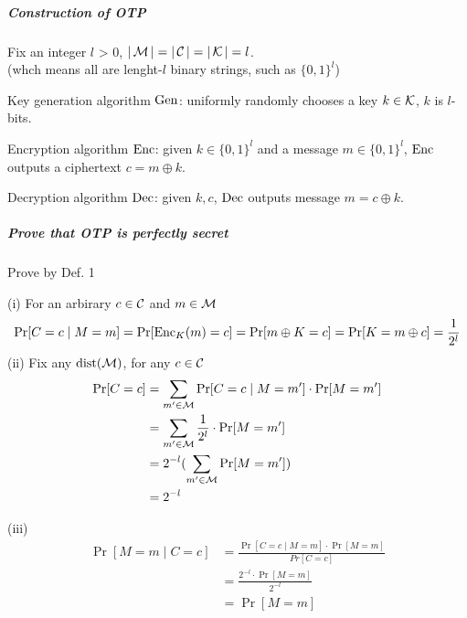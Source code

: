 \subparagraph{Construction of OTP}

Fix an integer \(l\) > 0, \(|\operatorname{\mathcal{M}}| = |\operatorname{\mathcal{C}}| = |\operatorname{\mathcal{K}}| = l\). \\
(whch means all are lenght-\(l\) binary strings, such as \(\{0, 1\}^l\))

Key generation algorithm \(\operatorname{Gen}\): uniformly randomly chooses a key \(k \in \operatorname{\mathcal{K}}\), \(k\) is \(l\)-bits.

Encryption algorithm \(\operatorname{Enc}\): given \(k \in \{0, 1\}^l\) and a message \(m \in \{0, 1\}^l\), \(\operatorname{Enc}\) outputs a ciphertext \(c = m \oplus k\).

Decryption algorithm \(\operatorname{Dec}\): given \(k, c\), \(\operatorname{Dec}\) outputs message \(m = c \oplus k\).

\subparagraph{Prove that OTP is perfectly secret}

Prove by Def. 1

(i) For an arbirary \(c \in \operatorname{\mathcal{C}}\) and \(m \in \operatorname{\mathcal{M}}\) \\
\[ \Pr[C = c \mid M = m] = \Pr[\operatorname{Enc}_K(m) = c] = \Pr[m \oplus K = c] = \Pr[K = m \oplus c] = \frac{1}{2^l}\]
(ii) Fix any \(\operatorname{dist}(\operatorname{\mathcal{M}})\), for any \(c \in \operatorname{\mathcal{C}}\)
\begin{align*}
	\Pr [C = c] &= \sum_{m' \in \operatorname{\mathcal{M}}} \Pr[C = c \mid M = m'] \cdot \Pr[M = m'] \\
	&= \sum_{m' \in \operatorname{\mathcal{M}}} \frac{1}{2^l} \cdot \Pr[M = m'] \\
	&= 2^{-l} (\sum_{m' \in \operatorname{\mathcal{M}}} \Pr[M = m']) \\
	&= 2^{-l}
\end{align*}

(iii)
\begin{align*}
	\Pr[M = m \mid C = c] &= \frac{\Pr[C = c \mid M = m] \cdot \Pr[M = m]}{Pr[C = c]} \\
	&= \frac{2^{-l} \cdot \Pr[M = m]}{2^{-l}} \\
	&= \Pr[M = m]
\end{align*}

